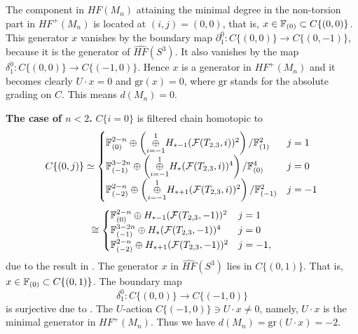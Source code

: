 \documentclass[11pt]{amsart}
\begin{document}
The component in $\widehat{HF}(M_n)$ attaining the minimal degree in the non-torsion part in $HF^+(M_n)$ is
located at $(i,j)=(0,0)$, that is, $x\in {\Bbb F}_{(0)}\subset C\{(0,0)\}$.
This generator $x$ vanishes by the boundary map $\partial^0_1:C\{(0,0)\}\to C\{(0,-1)\}$,
because it is the generator of $\widehat{HF}(S^3)$.
It also vanishes by the map $\delta^0_1:C\{(0,0)\}\to C\{(-1,0)\}$.
Hence $x$ is a generator in $HF^+(M_n)$ and it becomes clearly $U\cdot x=0$ and $\text{gr}(x)=0$,
where $\text{gr}$ stands for the absolute grading on $C$.
This means $d(M_n)=0$.

{\bf The case of $n< 2$.}
$C\{i=0\}$ is filtered chain homotopic to 
$$C\{(0,j)\}\simeq
\begin{cases}
{\Bbb F}_{(0)}^{2-n}\oplus\left(\overset{1}{\underset{i=-1}{\oplus}} H_{\ast-1}({\mathcal F}(T_{2,3},i))^2\right)/{\Bbb F}_{(1)}^2&j=1\\
{\Bbb F}_{(-1)}^{3-2n}\oplus\left(\overset{1}{\underset{i=-1}{\oplus}}H_{\ast}({\mathcal F}(T_{2,3},i))^4\right)/{\Bbb F}_{(0)}^4&j=0\\
{\Bbb F}_{(-2)}^{2-n}\oplus\left(\overset{1}{\underset{i=-1}{\oplus}}H_{\ast+1}({\mathcal F}(T_{2,3},i))^2\right)/{\Bbb F}_{(-1)}^2&j=-1
\end{cases}$$
$$\cong
\begin{cases}
{\Bbb F}_{(0)}^{2-n}\oplus H_{\ast-1}({\mathcal F}(T_{2,3},-1))^2&j=1\\
{\Bbb F}_{(-1)}^{3-2n}\oplus H_{\ast}({\mathcal F}(T_{2,3},-1))^4&j=0\\
{\Bbb F}_{(-2)}^{2-n}\oplus H_{\ast+1}({\mathcal F}(T_{2,3},-1))^2&j=-1,
\end{cases}$$
due to the result in \cite{H}.
The generator $x$ in $\widehat{HF}(S^3)$ lies in $C\{(0,1)\}$.
That is, $x\in {\Bbb F}_{(0)}\subset C\{(0,1)\}$.
The boundary map
$$\delta^0_1:C\{(0,0)\}\to C\{(-1,0)\}$$
is surjective due to \cite{H}.
The $U$-action $C\{(-1,0)\}\ni U\cdot x\neq 0$, namely, $U\cdot x$ is the minimal generator in $HF^+(M_n)$.
Thus we have $d(M_n)=\text{gr}(U\cdot x)=-2$.
\end{document}
